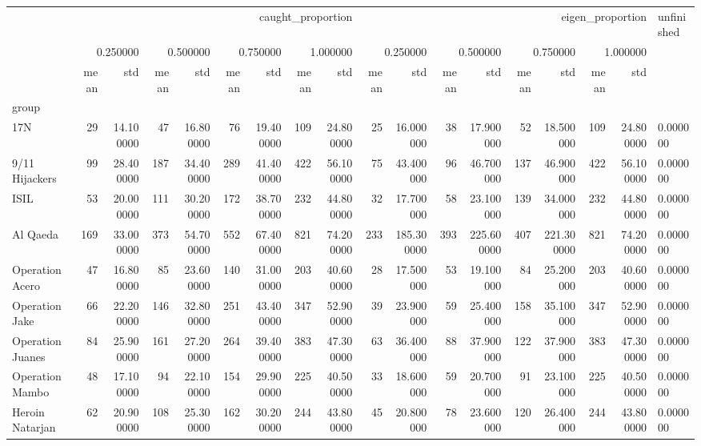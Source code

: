 \begin{tabular}{lrrrrrrrrrrrrrrrrl}
 & \multicolumn{8}{r}{caught_proportion} & \multicolumn{8}{r}{eigen_proportion} & unfinished \\
 & \multicolumn{2}{r}{0.250000} & \multicolumn{2}{r}{0.500000} & \multicolumn{2}{r}{0.750000} & \multicolumn{2}{r}{1.000000} & \multicolumn{2}{r}{0.250000} & \multicolumn{2}{r}{0.500000} & \multicolumn{2}{r}{0.750000} & \multicolumn{2}{r}{1.000000} &  \\
 & mean & std & mean & std & mean & std & mean & std & mean & std & mean & std & mean & std & mean & std &  \\
group &  &  &  &  &  &  &  &  &  &  &  &  &  &  &  &  &  \\
17N & 29 & 14.100000 & 47 & 16.800000 & 76 & 19.400000 & 109 & 24.800000 & 25 & 16.000000 & 38 & 17.900000 & 52 & 18.500000 & 109 & 24.800000 & 0.000000 \\
9/11 Hijackers & 99 & 28.400000 & 187 & 34.400000 & 289 & 41.400000 & 422 & 56.100000 & 75 & 43.400000 & 96 & 46.700000 & 137 & 46.900000 & 422 & 56.100000 & 0.000000 \\
ISIL & 53 & 20.000000 & 111 & 30.200000 & 172 & 38.700000 & 232 & 44.800000 & 32 & 17.700000 & 58 & 23.100000 & 139 & 34.000000 & 232 & 44.800000 & 0.000000 \\
Al Qaeda & 169 & 33.000000 & 373 & 54.700000 & 552 & 67.400000 & 821 & 74.200000 & 233 & 185.300000 & 393 & 225.600000 & 407 & 221.300000 & 821 & 74.200000 & 0.000000 \\
Operation Acero & 47 & 16.800000 & 85 & 23.600000 & 140 & 31.000000 & 203 & 40.600000 & 28 & 17.500000 & 53 & 19.100000 & 84 & 25.200000 & 203 & 40.600000 & 0.000000 \\
Operation Jake & 66 & 22.200000 & 146 & 32.800000 & 251 & 43.400000 & 347 & 52.900000 & 39 & 23.900000 & 59 & 25.400000 & 158 & 35.100000 & 347 & 52.900000 & 0.000000 \\
Operation Juanes & 84 & 25.900000 & 161 & 27.200000 & 264 & 39.400000 & 383 & 47.300000 & 63 & 36.400000 & 88 & 37.900000 & 122 & 37.900000 & 383 & 47.300000 & 0.000000 \\
Operation Mambo & 48 & 17.100000 & 94 & 22.100000 & 154 & 29.900000 & 225 & 40.500000 & 33 & 18.600000 & 59 & 20.700000 & 91 & 23.100000 & 225 & 40.500000 & 0.000000 \\
Heroin Natarjan & 62 & 20.900000 & 108 & 25.300000 & 162 & 30.200000 & 244 & 43.800000 & 45 & 20.800000 & 78 & 23.600000 & 120 & 26.400000 & 244 & 43.800000 & 0.000000 \\

\end{tabular}
